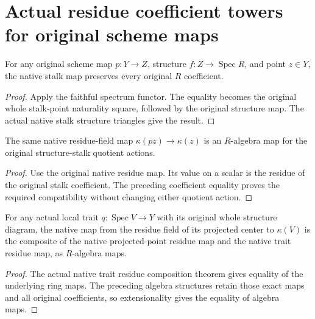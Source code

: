 \section{Actual residue coefficient towers for original scheme maps}
\begin{lemma}\label{lem:scheme-stalk-coefficients-naturality}
For any original scheme map $p:Y\to Z$, structure $f:Z\to\operatorname{Spec}R$, and point $z\in Y$, the native stalk map preserves every original $R$ coefficient.
\leanok
\end{lemma}
\begin{proof}
Apply the faithful spectrum functor. The equality becomes the original whole stalk-point naturality square, followed by the original structure map. The actual native stalk structure triangles give the result.
\end{proof}
\begin{definition}\label{def:scheme-residue-coefficient-map}
The same native residue-field map $\kappa(pz)\to\kappa(z)$ is an $R$-algebra map for the original structure-stalk quotient actions.
\leanok
\end{definition}
\begin{proof}
Use the original native residue map. Its value on a scalar is the residue of the original stalk coefficient. The preceding coefficient equality proves the required compatibility without changing either quotient action.
\end{proof}
\begin{lemma}\label{lem:scheme-trait-residue-coefficient-tower}
For any actual local trait $q:\operatorname{Spec}V\to Y$ with its original whole structure diagram, the native map from the residue field of its projected center to $\kappa(V)$ is the composite of the native projected-point residue map and the native trait residue map, as $R$-algebra maps.
\leanok
\end{lemma}
\begin{proof}
The actual native trait residue composition theorem gives equality of the underlying ring maps. The preceding algebra structures retain those exact maps and all original coefficients, so extensionality gives the equality of algebra maps.
\end{proof}
